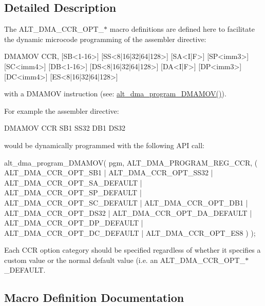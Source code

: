 \subsection{Detailed Description}
The A\+L\+T\+\_\+\+D\+M\+A\+\_\+\+C\+C\+R\+\_\+\+O\+P\+T\+\_\+$\ast$ macro definitions are defined here to facilitate the dynamic microcode programming of the assembler directive\+: \begin{DoxyVerb}DMAMOV CCR, [SB<1-16>] [SS<8|16|32|64|128>] [SA<I|F>]
            [SP<imm3>] [SC<imm4>]
            [DB<1-16>] [DS<8|16|32|64|128>] [DA<I|F>]
            [DP<imm3>] [DC<imm4>]
            [ES<8|16|32|64|128>]\end{DoxyVerb}
 with a D\+M\+A\+M\+OV instruction (see\+: \mbox{\hyperlink{group__ALT__DMA__PRG_ga6f996a101038e030bb8f6613b147a781}{alt\+\_\+dma\+\_\+program\+\_\+\+D\+M\+A\+M\+O\+V()}}).

For example the assembler directive\+: \begin{DoxyVerb}DMAMOV CCR SB1 SS32 DB1 DS32
\end{DoxyVerb}
 would be dynamically programmed with the following A\+PI call\+: \begin{DoxyVerb}alt_dma_program_DMAMOV( pgm,
                        ALT_DMA_PROGRAM_REG_CCR,
                        (   ALT_DMA_CCR_OPT_SB1
                          | ALT_DMA_CCR_OPT_SS32
                          | ALT_DMA_CCR_OPT_SA_DEFAULT
                          | ALT_DMA_CCR_OPT_SP_DEFAULT
                          | ALT_DMA_CCR_OPT_SC_DEFAULT
                          | ALT_DMA_CCR_OPT_DB1
                          | ALT_DMA_CCR_OPT_DS32
                          | ALT_DMA_CCR_OPT_DA_DEFAULT
                          | ALT_DMA_CCR_OPT_DP_DEFAULT
                          | ALT_DMA_CCR_OPT_DC_DEFAULT
                          | ALT_DMA_CCR_OPT_ES8
                        )
                      );
\end{DoxyVerb}


Each C\+CR option category should be specified regardless of whether it specifies a custom value or the normal default value (i.\+e. an A\+L\+T\+\_\+\+D\+M\+A\+\_\+\+C\+C\+R\+\_\+\+O\+P\+T\+\_\+$\ast$\+\_\+\+D\+E\+F\+A\+U\+LT. 

\subsection{Macro Definition Documentation}
\mbox{\label{group__DMA__CCR_ga428b18ad056257c6dd89f3f931c15df2}} 
